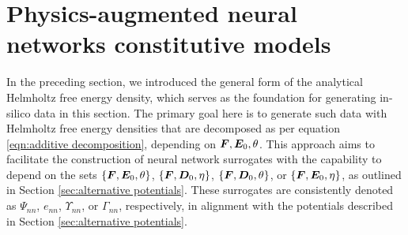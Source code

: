 \newpage
%



\section{Physics-augmented neural networks constitutive models}\label{eqn:calibration strategies}

In the preceding section, we introduced the general form of the analytical Helmholtz free energy density, which serves as the foundation for generating in-silico data in this section. The primary goal here is to generate such data with Helmholtz free energy densities that are decomposed as per equation \eqref{eqn:additive decomposition}, depending on ${\boldsymbol{F},\boldsymbol{E}_0,\theta}$. This approach aims to facilitate the construction of neural network surrogates with the capability to depend on the sets $\{\boldsymbol{F},\boldsymbol{E}_0,\theta\}$, $\{\boldsymbol{F},\boldsymbol{D}_0,\eta\}$, $\{\boldsymbol{F},\boldsymbol{D}_0,\theta\}$, or $\{\boldsymbol{F},\boldsymbol{E}_0,\eta\}$, as outlined in Section \ref{sec:alternative potentials}. These surrogates are consistently denoted as $\Psi_{nn}$, $e_{nn}$, $\Upsilon_{nn}$, or $\Gamma_{nn}$, respectively, in alignment with the potentials described in Section \ref{sec:alternative potentials}.

